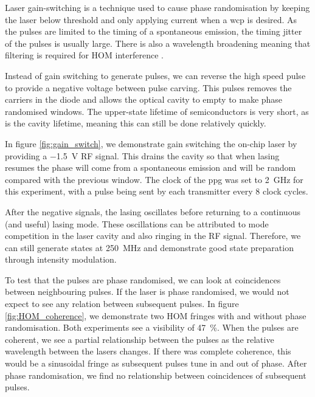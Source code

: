 
Laser gain-switching is a technique used to cause phase randomisation by keeping the laser below threshold and only applying current when a \ac{wcp} is desired. As the pulses are limited to the timing of a spontaneous emission, the timing jitter of the pulses is usually large. There is also a wavelength broadening meaning that filtering is required for \ac{HOM} interference \cite{Agnesi2019}. 

Instead of gain switching to generate pulses, we can reverse the high speed pulse to provide a negative voltage between pulse carving. This pulses removes the carriers in the diode and allows the optical cavity to empty to make phase randomised windows. The upper-state lifetime of semiconductors is very short, as is the cavity lifetime, meaning this can still be done relatively quickly. 

In figure \ref{fig:gain_switch}, we demonstrate gain switching the on-chip laser by providing a \SI{-1.5}{V} RF signal. This drains the cavity so that when lasing resumes the phase will come from a spontaneous emission and will be random compared with the previous window. The clock of the \ac{ppg} was set to \SI{2}{GHz} for this experiment, with a pulse being sent by each transmitter every 8 clock cycles. 

After the negative signals, the lasing oscillates before returning to a continuous (and useful) lasing mode. These oscillations can be attributed to mode competition in the laser cavity and also ringing in the RF signal. Therefore, we can still generate states at \SI{250}{MHz} and demonstrate good state preparation through intensity modulation.

To test that the pulses are phase randomised, we can look at coincidences between neighbouring pulses. If the laser is phase randomised, we would not expect to see any relation between subsequent pulses. In figure \ref{fig:HOM_coherence}, we demonstrate two \ac{HOM} fringes with and without phase randomisation. Both experiments see a visibility of \SI{47}{\percent}. When the pulses are coherent, we see a partial relationship between the pulses as the relative wavelength between the lasers changes. If there was complete coherence, this would be a sinusoidal fringe as subsequent pulses tune in and out of phase. After phase randomisation, we find no relationship between coincidences of subsequent pulses.

